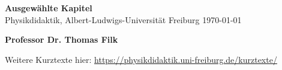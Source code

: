 \begin{titlepage}
       \begin{center}
              \vspace*{-1cm}
              \Huge
              \textbf{Ausgewählte Kapitel} \\
              \vspace*{1cm}
              \Large{Physikdidaktik, Albert-Ludwigs-Universität Freiburg}
              \vspace*{1cm}
              \normalsize
              \vspace{0.5cm}
              \today
                     
              \vspace{1.5cm}

              \textbf{Professor Dr. Thomas Filk}

              \vfill
                     
                     
              \vspace{0.8cm}
              
                     
              Weitere Kurztexte hier: \url{https://physikdidaktik.uni-freiburg.de/kurztexte/}
                     
       \end{center}
\end{titlepage}


